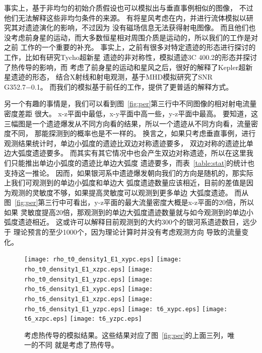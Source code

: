 事实上，\citet{Orlando2007}基于非均匀的初始介质假设也可以模拟出与垂直事例相似的图像，
不过他们无法解释这些非均匀条件的来源。
\citet{vanMarle2010}有将星风考虑在内，并进行流体模拟以研究其对遗迹演化的影响，不过因为
没有磁场信息无法获得射电图像。
而且他们也没考虑前身星的运动，而大多数恒星相对周围介质是运动的，所以我们的工作是对之前
工作的一个重要的补充。
事实上，之前有很多对特定遗迹的形态进行探讨的工作，比如\citet{Vigh2011}有研究Tycho超新星
遗迹的非对称性，\citet{Schneiter2006}模拟遗迹3C 400.2的形态并探讨了热传导的影响，而
\citet{Toledo-Roy2014}考虑了前身星的运动和星风之后，很好的解释了Kepler超新星遗迹的形态，
\citet{Toledo-Roy2014a}结合X射线和射电观测，基于MHD模拟研究了SNR G352.7−0.1。
而我们的模拟基于前任的工作，提供了更普适的解释方式。

另一个有趣的事情是，我们可以看到图~\ref{fig:per}第三行中不同图像的相对射电流量密度差距
很大。
x-z平面中最低，x-y平面中高一些，y-z平面中最高。
要知道，这三幅图是一个遗迹爆发从不同方向看的结果，所以一个遗迹从不同方向看，流量密度不同，
那能探测到的概率也是不一样的。
换言之，如果只考虑垂直事例，进行观测结果统计时，单边小弧度的遗迹比双边对称遗迹要多，
双边对称的遗迹比单边大弧度遗迹要多。
而其实有其它情况中也会产生双边对称遗迹，所以在这里我们只能推出单边小弧度的遗迹比单边大弧度
遗迹要多，而表~\ref{table:stat}的统计也支持这一推论。
因而，如果银河系中遗迹爆发朝向我们的方向是随机的，那实际上我们可观测到的单边小弧度和单边大
弧度遗迹数量应该相近，目前的差值是因为观测的灵敏度不够，如果提高灵敏度可以观测到更多单边
大弧度遗迹。
而从图~\ref{fig:per}第三行中可看出，y-z平面的最大流量密度大概是x-z平面的20倍，所以如果
灵敏度提高20倍，那观测到的单边大弧度遗迹数量就与如今观测到的单边小弧度遗迹相近。
这或许可以解释目前观测到的大约300个的银河系遗迹数目\citep{2014BASI...42...47G}，远少于
理论预言的至少1000个\citep{Frail1994a,Tammann1994}，因为理论计算时并没有考虑观测方向
导致的流量变化。

\begin{figure*}
    \centering
    \texttt{[image: rho\_t0\_density1\_E1\_xypc.eps]}
    \texttt{[image: rho\_t0\_density1\_E1\_xzpc.eps]}
    \texttt{[image: rho\_t0\_density1\_E1\_yzpc.eps]}\newline
    \texttt{[image: rho\_t6\_density1\_E1\_xypc.eps]}
    \texttt{[image: rho\_t6\_density1\_E1\_xzpc.eps]}
    \texttt{[image: rho\_t6\_density1\_E1\_yzpc.eps]}\newline
    \texttt{[image: t6\_xypc.eps]}
    \texttt{[image: t6\_xzpc.eps]}
    \texttt{[image: t6\_yzpc.eps]}\newline
    \caption{考虑热传导的模拟结果。这些结果对应了图~\ref{fig:per}的上面三列，唯一的不同
    就是考虑了热传导。}
\label{fig:conduction}
\end{figure*}

